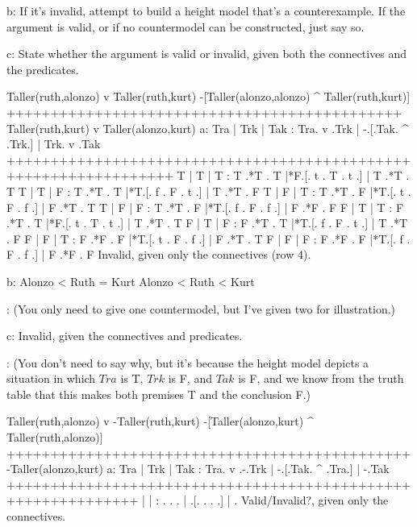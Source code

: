 b: If it's invalid, attempt to build a height model that's a counterexample. If the argument is valid, or if no countermodel can be constructed, just say so.

c: State whether the argument is valid or invalid, given both the connectives and the predicates.
\endlist

\problems
{}
\argument
 Taller(ruth,alonzo) v Taller(ruth,kurt)
 -[Taller(alonzo,alonzo) ^ Taller(ruth,kurt)]
+++++++++++++++++++++++++++++++++++++++++++++
 Taller(ruth,kurt) v Taller(alonzo,kurt)
\endargument
        \answerlist
        a:
        \truthtable
         Tra | Trk | Tak : Tra. v .Trk | -.[.Tak. ^ .Trk.] | Trk. v .Tak
        +++++++++++++++++++++++++++++++++++++++++++++++++++++++++++++++++
          T  |  T  |  T  :  T .*T . T  |*F.[. t . T . t .] |  T .*T . T
          T  |  T  |  F  :  T .*T . T  |*T.[. f . F . t .] |  T .*T . F
          T  |  F  |  T  :  T .*T . F  |*T.[. t . F . f .] |  F .*T . T
          T  |  F  |  F  :  T .*T . F  |*T.[. f . F . f .] |  F .*F . F
          F  |  T  |  T  :  F .*T . T  |*F.[. t . T . t .] |  T .*T . T
          F  |  T  |  F  :  F .*T . T  |*T.[. f . F . t .] |  T .*T . F
          F  |  F  |  T  :  F .*F . F  |*T.[. t . F . f .] |  F .*T . T
          F  |  F  |  F  :  F .*F . F  |*T.[. f . F . f .] |  F .*F . F
        \endtruthtable
        Invalid, given only the connectives (row 4).

        b:
        \heightmodel
         Alonzo < Ruth = Kurt
        \endheightmodel
        \OR
        \heightmodel
         Alonzo < Ruth < Kurt
        \endheightmodel

:       (You only need to give one countermodel, but I've given two for illustration.)

        c: Invalid, given the connectives and predicates.

:       (You don't need to say why, but it's because the height model depicts a situation in which $Tra$ is T, $Trk$ is F, and $Tak$ is F, and we know from the truth table that this makes both premises T and the conclusion F.)
        \endanswerlist

\argument
 Taller(ruth,alonzo) v -Taller(ruth,kurt)
 -[Taller(alonzo,kurt) ^ Taller(ruth,alonzo)]
++++++++++++++++++++++++++++++++++++++++++++++
 -Taller(alonzo,kurt)
\endargument
        \answerlist
        a:
        \truthtable
         Tra | Trk | Tak : Tra. v .-.Trk | -.[.Tak. ^ .Tra.] | -.Tak
        +++++++++++++++++++++++++++++++++++++++++++++++++++++++++++++
             |     |     :    .   . .    |  .[.   .   .   .] |  .  
        \endtruthtable
        Valid/Invalid?, given only the connectives.

